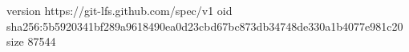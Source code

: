 version https://git-lfs.github.com/spec/v1
oid sha256:5b5920341bf289a9618490ea0d23cbd67bc873db34748de330a1b4077e981c20
size 87544
